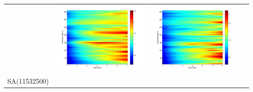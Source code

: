 \documentclass[11pt]{article}
\begin{document}
\begin{table}[H]
{\begin{tabular}{cccc}
&\begin{minipage}{.3\textwidth}\includegraphics[width=\linewidth]{resultgraph/05585000pep.png}\end{minipage}
&\begin{minipage}{.3\textwidth}\includegraphics[width=\linewidth]{resultgraph/05585000pepq.png}\end{minipage}
\\
SA(11532500)

\end{tabular}}
\end{table}
\end{document}
